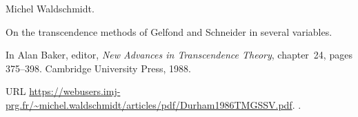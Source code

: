 Michel Waldschmidt.

\newblock On the transcendence methods of {Gelfond} and {Schneider} in several
  variables.

\newblock In Alan Baker, editor, \emph{New Advances in Transcendence Theory},
  chapter~24, pages 375--398. Cambridge University Press, 1988{}.

\newblock URL
  \url{https://webusers.imj-prg.fr/~michel.waldschmidt/articles/pdf/Durham1986TMGSSV.pdf}.
\newblock {}.